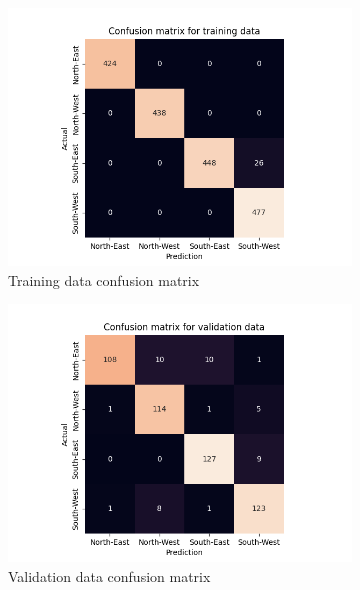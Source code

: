 \documentclass[10pt,twocolumn,letterpaper]{article}
\begin{document}
\begin{figure}[h]
  \centering
  \begin{subfigure}{.33\linewidth}
    \includegraphics[width=\linewidth, trim={7em, 0em, 9em, 5em}, clip]{cnn_cfsn_train}
    \caption{Training data confusion matrix}
    \label{fig:cnn_train}
  \end{subfigure}
  \begin{subfigure}{0.33\linewidth}
    \includegraphics[width=\linewidth, trim={7em, 0em, 9em, 5em}, clip]{cnn_cfsn_valid}
    \caption{Validation data confusion matrix}
    \label{fig:cnn_valid}
  \end{subfigure}
  \begin{subfigure}{0.33\linewidth}

\end{subfigure}
\end{figure}
\end{document}
